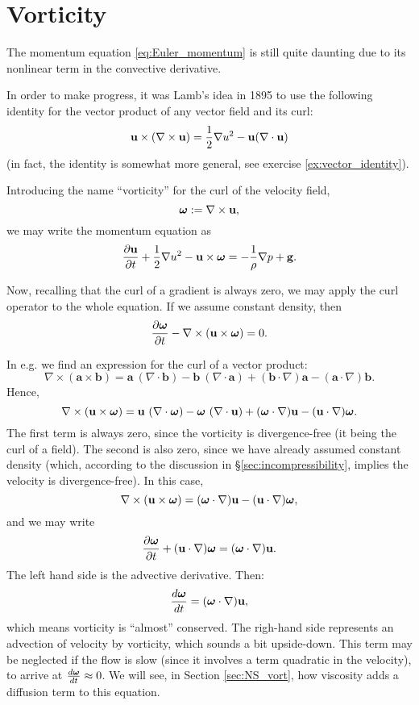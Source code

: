 \section{Vorticity}
\label{sec:Euler_vorticity}

The momentum equation \ref{eq:Euler_momentum} is still quite daunting
due to its nonlinear term in the convective derivative.

In order to make progress, it was Lamb's idea in 1895 to use the
following identity for the vector product of any vector field and its
curl:
\begin{equation}
  \label{eq:Lambs_identity}
  \mathbf{u} \times ( \nabla\times \mathbf{u}) =
  \frac12 \nabla u^2 - \mathbf{u} (\nabla\cdot\mathbf{u} )
\end{equation}
(in fact, the identity is somewhat more general, see exercise
\ref{ex:vector_identity}).

Introducing the name ``vorticity'' for the curl of the velocity field,
\[
\bm{\omega} := \nabla\times\mathbf{u} ,
\]
we may write the momentum equation as
\begin{equation}
  \label{eq:Euler_momentum_w_vort}
  \frac{\partial \mathbf{u} }{\partial t} +
  \frac12 \nabla u^2 - \mathbf{u} \times\bm{\omega} =
  - \frac{1}{\rho} \nabla p 
  + \mathbf{g} .
\end{equation}

Now, recalling that the curl of a gradient is always zero,
we may apply the curl operator to the whole equation.
If we assume constant density, then
\[
\frac{\partial \bm{\omega} }{\partial t} -
\nabla\times(\mathbf{u}\times\bm{\omega}) = 0 .
\]

In e.g. \cite{wiki:Vector_calculus_identities} we find an expression
for the curl of a vector product:
\[
  \nabla \times (\mathbf {a} \times \mathbf {b} ) =
  \mathbf {a} \ (\nabla \cdot \mathbf {b} )
  -\mathbf {b} \ (\nabla \cdot \mathbf {a} )
  +(\mathbf {b} \cdot \nabla )\mathbf {a}
  -(\mathbf {a} \cdot \nabla )\mathbf {b} .
\]
Hence,
\[
  \nabla \times (\mathbf{u} \times \bm{\omega} ) =
  \mathbf{u} \ (\nabla \cdot \bm{\omega} )
  -\bm{\omega} \ (\nabla \cdot \mathbf{u} )
  +(\bm{\omega} \cdot \nabla )\mathbf{u}
  -(\mathbf{u} \cdot \nabla )\bm{\omega}.
\]
The first term is always zero, since the vorticity is divergence-free
(it being the curl of a field). The second is also zero,
since we have already assumed constant density (which, according
to the discussion in \S \ref{sec:incompressibility},
implies the velocity is divergence-free).
In this case,
\begin{equation}
  \label{eq:conv_accel_as_vort}
  \nabla \times (\mathbf{u} \times \bm{\omega} ) =
  (\bm{\omega} \cdot \nabla )\mathbf{u}
  -(\mathbf{u} \cdot \nabla )\bm{\omega},
\end{equation}
and we may write
\[
  \frac{\partial \bm{\omega} }{\partial t}
  + ( \mathbf{u} \cdot \nabla )\bm{\omega} =  (\bm{\omega} \cdot \nabla )\mathbf{u} .
\]
The left hand side is the advective derivative. Then:
\[
  \frac{d \bm{\omega} }{d t}  =  (\bm{\omega} \cdot \nabla )\mathbf{u} ,
\]
which means vorticity is ``almost'' conserved. The righ-hand side
represents an advection of velocity by vorticity, which sounds a bit
upside-down. This term may be neglected if the flow is slow (since it
involves a term quadratic in the velocity), to arrive at
$\frac{d \bm{\omega} }{d t}\approx 0$. We will see, in Section
\ref{sec:NS_vort}, how viscosity adds a diffusion term to this
equation.


